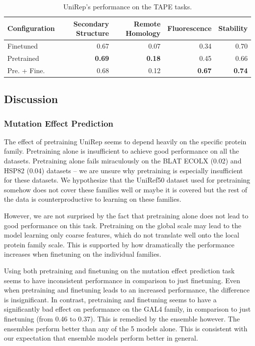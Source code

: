 \begin{table}[ht]
    \centering
    \begin{tabularx}{\textwidth}{lrrrr}
    \hline
    \textbf{Configuration} & \textbf{Secondary Structure} & \textbf{Remote Homology} & \textbf{Fluorescence} & \textbf{Stability} \\ \hline
    Finetuned              & 0.67                         & 0.07                     & 0.34                  & 0.70 \\
    Pretrained             & \textbf{0.69}                & \textbf{0.18}            & 0.45                  & 0.66 \\
    Pre. + Fine.           & 0.68                         & 0.12                     & \textbf{0.67}         & \textbf{0.74} \\
    \hline
    \end{tabularx}
    \caption{UniRep's performance on the TAPE tasks.}
    \label{tab:unirep_tape_results}
\end{table}

\subsection{Discussion}
\subsubsection{Mutation Effect Prediction}
The effect of pretraining UniRep seems to depend heavily on the specific protein family. Pretraining alone is insufficient to achieve good performance on all the datasets. Pretraining alone fails miraculously on the BLAT ECOLX (0.02) and HSP82 (0.04) datasets -- we are unsure why pretraining is especially insufficient for these datasets. We hypothesize that the UniRef50 dataset used for pretraining somehow does not cover these families well or maybe it is covered but the rest of the data is counterproductive to learning on these families.

However, we are not surprised by the fact that pretraining alone does not lead to good performance on this task. Pretraining on the global scale may lead to the model learning only coarse features, which do not translate well onto the local protein family scale. This is supported by how dramatically the performance increases when finetuning on the individual families.

Using both pretraining and finetuning on the mutation effect prediction task seems to have inconsistent performance in comparison to just finetuning. Even when pretraining and finetuning leads to an increased performance, the difference is insignificant. In contrast, pretraining and finetuning seems to have a significantly bad effect on performance on the GAL4 family, in comparison to just finetuning (from 0.46 to 0.37). This is remedied by the ensemble however. The ensembles perform better than any of the 5 models alone. This is consistent with our expectation that ensemble models perform better in general.

